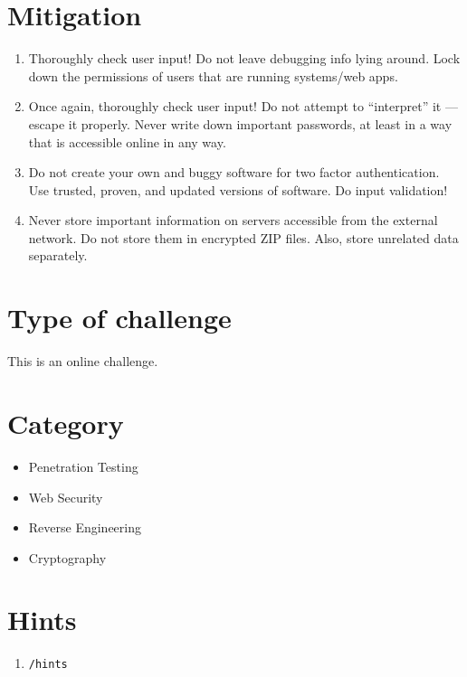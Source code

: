 \documentclass[a4paper]{article}
\begin{document}
\section{Mitigation}

\begin{enumerate}
  \item Thoroughly check user input!
      Do not leave debugging info lying around. Lock down the permissions
      of users that are running systems/web apps.
  \item Once again, thoroughly check user input! Do not attempt to
      ``interpret'' it --- escape it properly. Never write down important passwords,
        at least in a way that is accessible online in any way.
  \item Do not create your own and buggy software for two factor authentication. Use
        trusted, proven, and updated versions of software. Do input
        validation!
  \item Never store important information on servers accessible from the
        external network. Do not store them in encrypted ZIP files. Also,
        store unrelated data separately.
\end{enumerate}

\section{Type of challenge}

This is an online challenge.

\section{Category}

\begin{itemize}
  \item Penetration Testing
  \item Web Security
  \item Reverse Engineering
  \item Cryptography
\end{itemize}

\section{Hints}

\begin{enumerate}
    \item \texttt{/hints}
\end{enumerate}
\end{document}

